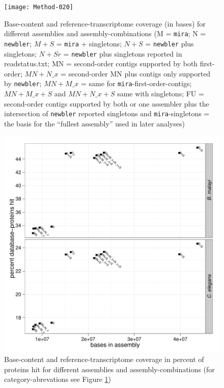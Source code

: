 \documentclass[12pt,a4paper]{article}
\begin{document}
\begin{figure}[H]

\texttt{[image: Method-020]}
\caption{Base-content and reference-transcriptome coverage (in bases)
  for different assemblies and assembly-combinations (M =
  \texttt{mira}; N = \texttt{newbler}; $M+S$ = \texttt{mira} +
  singletons; $N+S$ = \texttt{newbler} plus singletons; $N+Sr$ =
  \texttt{newbler} plus singletons reported in readstatus.txt; MN =
  second-order contigs supported by both first-order; $MN+N\_x$ =
  second-order MN plus contigs only supported by \texttt{newbler};
  $MN+M\_x$ = same for \texttt{mira}-first-order-contigs; $MN+M\_x+S$ and
  $MN+N\_x+S$ same with singletons; FU = second-order contigs
  supported by both or one assembler plus the intersection of
  \texttt{newbler} reported singletons and \texttt{mira}-singletons =
  the basis for the ``fullest assembly'' used in later analyses)}
\label{fig:basecov}
\end{figure}


\begin{figure}[H]

\includegraphics{Method-021}
\caption{Base-content and reference-transcriptome coverage in percent
  of proteins hit for different assemblies and assembly-combinations
  (for category-abrevations see Figure \ref{fig:basecov})}
\label{fig:protcov}
\end{figure}
\end{document}
